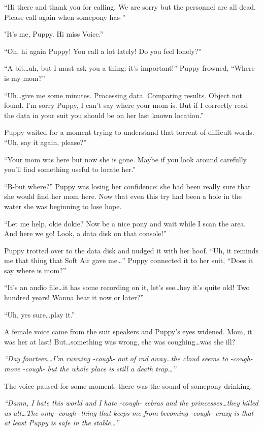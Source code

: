 ``Hi there and thank you for calling. We are sorry but the personnel are all dead. Please call again when somepony has-''

"It's me, Puppy. Hi miss Voice.''

``Oh, hi again Puppy! You call a lot lately! Do you feel lonely?''

``A bit\dots uh, but I must ask you a thing: it's important!'' Puppy frowned, ``Where is my mom?''

``Uh\dots give me some minutes. Processing data. Comparing results. Object not found. I'm sorry Puppy, I can't say where your mom is. But if I correctly read the data in your suit you should be on her last known location.''

Puppy waited for a moment trying to understand that torrent of difficult words. ``Uh, say it again, please?''

``Your mom was here but now she is gone. Maybe if you look around carefully you'll find something useful to locate her.''

``B-but where?'' Puppy was losing her confidence: she had been really sure that she would find her mom here. Now that even this try had been a hole in the water she was beginning to lose hope.

``Let me help, okie dokie? Now be a nice pony and wait while I scan the area. And here we go! Look, a data disk on that console!''

Puppy trotted over to the data disk and nudged it with her hoof. ``Uh, it reminds me that thing that Soft Air gave me\dots'' Puppy connected it to her suit, ``Does it say where is mom?''

``It's an audio file\dots it has some recording on it, let's see\dots hey it's quite old! Two hundred years! Wanna hear it now or later?''

``Uh, yes sure\dots play it.''

A female voice came from the suit speakers and Puppy's eyes widened. Mom, it was her at last! But\dots something was wrong, she was coughing\dots was she ill?

\emph{``Day fourteen\dots I'm running -cough- out of rad away\dots the cloud seems to -cough- move -cough- but the whole place is still a death trap\dots''}

The voice paused for some moment, there was the sound of somepony drinking.

\emph{``Damn, I hate this world and I hate -cough- zebras and the princesses\dots they killed us all\dots The only -cough- thing that keeps me from becoming -cough- crazy is that at least Puppy is safe in the stable\dots''}


